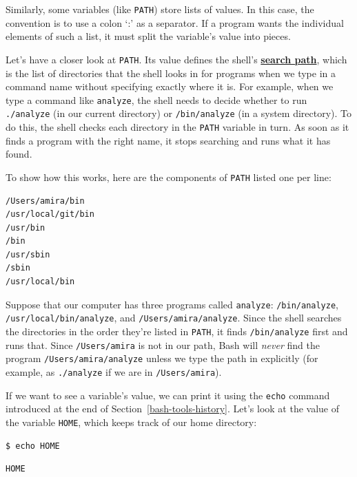 \documentclass[
]{krantz}
\newcommand{\gref}[2]{\hyperlink{#2}{\textbf{#1}}}
\begin{document}
Similarly, some variables (like \texttt{PATH}) store lists of values.
In this case, the convention is to use a colon `:' as a separator.
If a program wants the individual elements of such a list,
it must split the variable's value into pieces.

Let's have a closer look at \texttt{PATH}.
Its value defines the shell's \gref{search path}{search\_path},
which is the list of directories that the shell looks in for programs
when we type in a command name without specifying exactly where it is.
For example,
when we type a command like \texttt{analyze},
the shell needs to decide whether to run \texttt{./analyze} (in our current directory)
or \texttt{/bin/analyze} (in a system directory).
To do this,
the shell checks each directory in the \texttt{PATH} variable in turn.
As soon as it finds a program with the right name,
it stops searching and runs what it has found.

To show how this works,
here are the components of \texttt{PATH} listed one per line:

\begin{verbatim}
/Users/amira/bin
/usr/local/git/bin
/usr/bin
/bin
/usr/sbin
/sbin
/usr/local/bin
\end{verbatim}

Suppose that our computer has three programs called \texttt{analyze}:
\texttt{/bin/analyze},
\texttt{/usr/local/bin/analyze},
and \texttt{/Users/amira/analyze}.
Since the shell searches the directories in the order they're listed in \texttt{PATH},
it finds \texttt{/bin/analyze} first and runs that.
Since \texttt{/Users/amira} is not in our path,
Bash will \emph{never} find the program \texttt{/Users/amira/analyze}
unless we type the path in explicitly
(for example,
as \texttt{./analyze} if we are in \texttt{/Users/amira}).

If we want to see a variable's value,
we can print it using the \texttt{echo} command
introduced at the end of Section~\ref{bash-tools-history}.
Let's look at the value of the variable \texttt{HOME},
which keeps track of our home directory:

\begin{verbatim}
$ echo HOME
\end{verbatim}

\begin{verbatim}
HOME
\end{verbatim}
\end{document}
